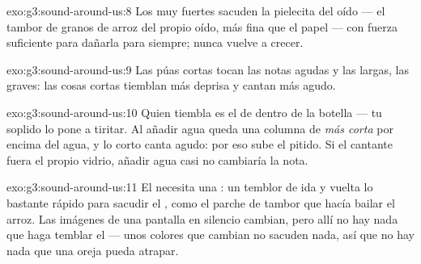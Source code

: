 \begin{solution}{exo:g3:sound-around-us:8}
Los  muy fuertes sacuden la pielecita del oído --- el tambor
de granos de arroz del propio oído, más fina que el papel --- con
fuerza suficiente para dañarla para siempre; nunca vuelve a crecer.
\end{solution}

\begin{solution}{exo:g3:sound-around-us:9}
Las púas cortas tocan las notas agudas y las largas, las graves: las
cosas cortas tiemblan más deprisa y cantan más agudo.
\end{solution}

\begin{solution}{exo:g3:sound-around-us:10}
Quien tiembla es el  de dentro de la botella --- tu soplido lo pone
a tiritar. Al añadir agua queda una columna de  \emph{más corta}
por encima del agua, y lo corto canta agudo: por eso sube el pitido.
Si el cantante fuera el propio vidrio, añadir agua casi no cambiaría
la nota.
\end{solution}

\begin{solution}{exo:g3:sound-around-us:11}
El  necesita una \emph{}: un temblor de ida y vuelta
lo bastante rápido para sacudir el , como el parche de tambor que
hacía bailar el arroz. Las imágenes de una pantalla en silencio
cambian, pero allí no hay nada que haga temblar el  --- unos
colores que cambian no sacuden nada, así que no hay nada que una
oreja pueda atrapar.
\end{solution}

